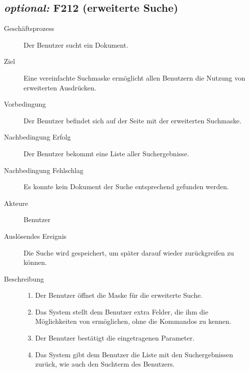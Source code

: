 \subsection{\emph{optional:} F212 (erweiterte Suche)}
\label{F:n00bSuche}
\begin{description}
  \item[Geschäftsprozess]Der Benutzer sucht ein Dokument.
  \item[Ziel]Eine vereinfachte Suchmaske ermöglicht allen Benutzern die Nutzung von erweiterten Ausdrücken.
  \item[Vorbedingung]Der Benutzer befindet sich auf der Seite mit der erweiterten Suchmaske.
  \item[Nachbedingung Erfolg]Der Benutzer bekommt eine Liste aller Suchergebnisse.
  \item[Nachbedingung Fehlschlag]Es konnte kein Dokument der Suche entsprechend gefunden werden.
  \item[Akteure]Benutzer
  \item[Auslösendes Ereignis]Die Suche wird gespeichert, um später darauf wieder zurückgreifen zu können.
  \item[Beschreibung]\hfill
    \begin{enumerate}
      \item Der Benutzer öffnet die Maske für die erweiterte Suche.
      \item Das System stellt dem Benutzer extra Felder, die ihm die Möglichkeiten von  ermöglichen, ohne die Kommandos zu kennen.
      \item Der Benutzer bestätigt die eingetragenen Parameter.
      \item Das System gibt dem Benutzer die Liste mit den Suchergebnissen zurück, wie auch den Suchterm des Benutzers.
    \end{enumerate}
\end{description}


